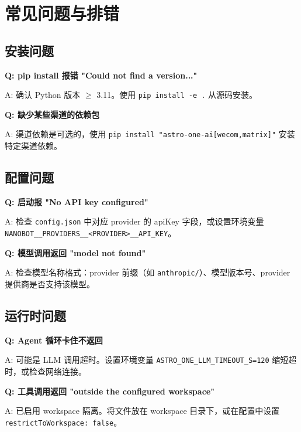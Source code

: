 \documentclass[12pt,a4paper,UTF8]{ctexart}
\begin{document}
\chapter{常见问题与排错}

\section{安装问题}

\begin{notebox}
\textbf{Q: pip install 报错 "Could not find a version..."}

A: 确认 Python 版本 $\geq$ 3.11。使用 \texttt{pip install -e .} 从源码安装。
\end{notebox}

\begin{notebox}
\textbf{Q: 缺少某些渠道的依赖包}

A: 渠道依赖是可选的，使用 \texttt{pip install "astro-one-ai[wecom,matrix]"} 安装特定渠道依赖。
\end{notebox}

\section{配置问题}

\begin{notebox}
\textbf{Q: 启动报 "No API key configured"}

A: 检查 \texttt{config.json} 中对应 provider 的 apiKey 字段，或设置环境变量 \texttt{NANOBOT\_\_PROVIDERS\_\_<PROVIDER>\_\_API\_KEY}。
\end{notebox}

\begin{notebox}
\textbf{Q: 模型调用返回 "model not found"}

A: 检查模型名称格式：provider 前缀（如 \texttt{anthropic/}）、模型版本号、provider 提供商是否支持该模型。
\end{notebox}

\section{运行时问题}

\begin{notebox}
\textbf{Q: Agent 循环卡住不返回}

A: 可能是 LLM 调用超时。设置环境变量 \texttt{ASTRO\_ONE\_LLM\_TIMEOUT\_S=120} 缩短超时，或检查网络连接。
\end{notebox}

\begin{notebox}
\textbf{Q: 工具调用返回 "outside the configured workspace"}

A: 已启用 workspace 隔离。将文件放在 workspace 目录下，或在配置中设置 \texttt{restrictToWorkspace: false}。
\end{notebox}
\end{document}
